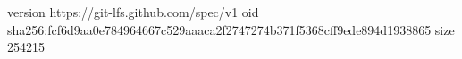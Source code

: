 version https://git-lfs.github.com/spec/v1
oid sha256:fcf6d9aa0e784964667c529aaaca2f2747274b371f5368cff9ede894d1938865
size 254215
